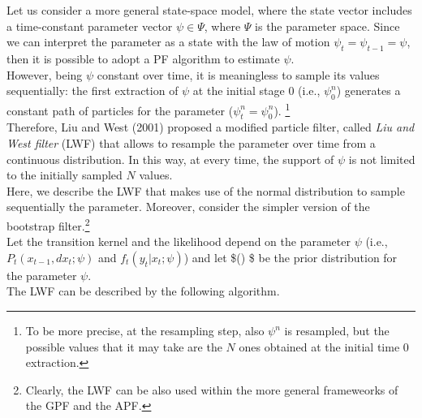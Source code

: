 \documentclass[
]{book}
\theoremstyle{break}
\theoremstyle{nonumberplain}
\begin{document}
Let us consider a more general state-space model, where the state vector
includes a time-constant parameter vector \(\psi \in \Psi\), where
\(\Psi\) is the parameter space. Since we can interpret the parameter as
a state with the law of motion \(\psi_t=\psi_{t-1}=\psi\), then it is
possible to adopt a PF algorithm to estimate \(\psi\).\\
However, being \(\psi\) constant over time, it is meaningless to sample
its values sequentially: the first extraction of \(\psi\) at the initial
stage 0 (i.e., \(\psi_0^n\)) generates a constant path of particles for
the parameter (\(\psi_t^n=\psi_0^n\)).
\footnote{To be more precise, at the resampling step, also $\psi^n$ is resampled, but the possible values that it may take are the $N$ ones obtained at the initial time 0 extraction.}\\
Therefore, Liu and West (2001) proposed a modified particle filter,
called \textit{Liu and West filter} (LWF) that allows to resample the
parameter over time from a continuous distribution. In this way, at
every time, the support of \(\psi\) is not limited to the initially
sampled \(N\) values.\\
Here, we describe the LWF that makes use of the normal distribution to
sample sequentially the parameter. Moreover, consider the simpler
version of the bootstrap
filter.\footnote{Clearly, the LWF can be also used within the more general frameweorks of the GPF and the APF.}\\
Let the transition kernel and the likelihood depend on the parameter
\(\psi\) (i.e., \(P_t(x_{t-1},dx_t;\psi)\) and \(f_t(y_t|x_t;\psi)\))
and let \$\pi(\cdot) \$ be the prior distribution for the parameter
\(\psi\).\\
The LWF can be described by the following algorithm.
\end{document}
